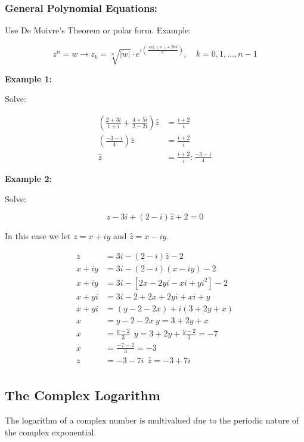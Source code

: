 \subsubsection{General Polynomial Equations:}

 Use De Moivre’s Theorem or polar form. Example:
	      
\[
	z^n = w \to z_k = \sqrt[n]{|w|} \cdot e^{i\left( \frac{\arg(w) + 2k\pi}{n} \right)}, \quad k = 0, 1, 
	\dots, n-1
\]

\textbf{Example 1:}
\vspace{\baselineskip}

Solve:

\begin{align*}
	\left( \frac{2 + 3i}{1 + i} + \frac{4 + 5i}{2 - 2i}\right) \hat{z} &= \frac{i + 2}{i}\\
	\left( \frac{-3 -i}{4} \right) \hat{z} &= \frac{i + 2}{i}\\
	\hat{z} &= \frac{i + 2}{i} : \frac{-3 -i}{4}
\end{align*}

\textbf{Example 2:}
\vspace{\baselineskip}

Solve:

\[
	z - 3i + (2 -i)\hat{z} + 2 = 0
\]

In this case we let \( z = x + iy \) and \( \hat{z} = x - iy \).

\begin{align*}
	z &= 3i - (2 - i)\hat{z} - 2\\
	x + iy &= 3i - (2 - i)(x - iy) - 2\\
	x + iy &= 3i - [2x - 2yi -xi +yi^2] - 2\\
	x + yi &= 3i - 2 + 2x + 2yi + xi + y\\
	x + yi &= (y - 2 -2x) + i(3 + 2y + x)\\
	x &= y - 2 -2x\ y = 3 + 2y + x\\
	x &= \frac{y - 2}{3}\ \ y = 3 + 2y + \frac{y-2}{3} = -7\\
	x &= \frac{-7 -2}{3} = -3\\
	z &= -3 -7i\ \ \hat{z} = -3 + 7i\\
\end{align*}

\subsection{The Complex Logarithm}

The logarithm of a complex number is multivalued due to the periodic nature of the complex exponential.

